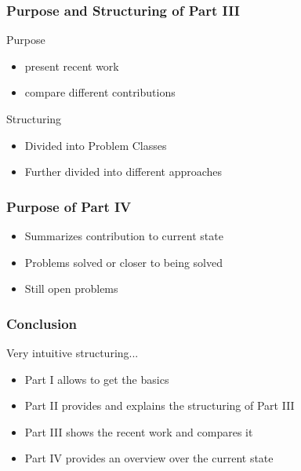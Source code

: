 \documentclass[8pt]{beamer}
\begin{document}
\begin{frame}
\frametitle{Purpose and Structuring of Part III}
Purpose
\begin{itemize}
\item present recent work 
\item compare different contributions
\end{itemize}
Structuring
\begin{itemize}
\item Divided into Problem Classes
\item Further divided into different approaches
\end{itemize}
\end{frame}

\begin{frame}
\frametitle{Purpose of Part IV}
\begin{itemize}
\item Summarizes contribution to current state
\item Problems solved or closer to being solved
\item Still open problems
\end{itemize}
\end{frame}

\begin{frame}
\frametitle{Conclusion}
Very intuitive structuring...
\begin{itemize}
\item Part I allows to get the basics
\item Part II provides and explains the structuring of Part III
\item Part III shows the recent work and compares it
\item Part IV provides an overview over the current state
\end{itemize}
\end{frame}
\end{document}
